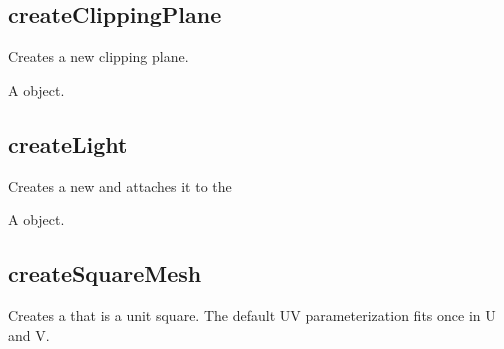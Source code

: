 \documentclass[letterpaper,12pt,english,openany,oneside]{sphinxmanual}
\begin{document}
\subsection{createClippingPlane}
\label{\detokenize{JS_3D_API:createclippingplane}}
Creates a new clipping plane.

\label{\detokenize{JS_3D_API:syntax-103}}

\begin{sphinxVerbatim}[commandchars=\\\{\}]
\end{sphinxVerbatim}
\label{\detokenize{JS_3D_API:returns-104}}

A  object.


\subsection{createLight}
\label{\detokenize{JS_3D_API:createlight}}
Creates a new  and attaches it to the 

\label{\detokenize{JS_3D_API:syntax-104}}

\begin{sphinxVerbatim}[commandchars=\\\{\}]
\end{sphinxVerbatim}
\label{\detokenize{JS_3D_API:returns-105}}

A  object.


\subsection{createSquareMesh}
\label{\detokenize{JS_3D_API:createsquaremesh}}
Creates a  that is a unit square. The default UV parameterization fits once in U and V.

\label{\detokenize{JS_3D_API:syntax-105}}

\begin{sphinxVerbatim}[commandchars=\\\{\}]
  
\end{sphinxVerbatim}
\label{\detokenize{JS_3D_API:parameters-77}}
\end{document}
